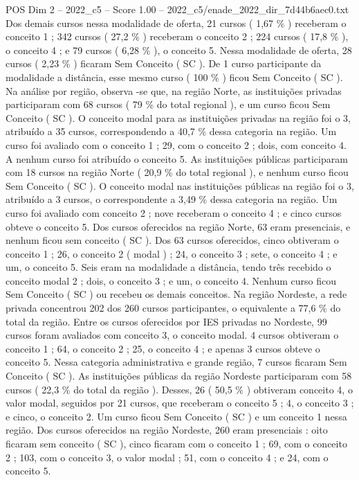\begin{textsample}{POS Dim 2 – 2022\_c5 – Score 1.00 – 2022\_c5/enade\_2022\_dir\_7d44b6aec0.txt}
Dos demais cursos nessa modalidade de oferta, 21 cursos ( 1,67 \% ) receberam o conceito 1 ; 342 cursos ( 27,2 \% ) receberam o conceito 2 ; 224 cursos ( 17,8 \% ), o conceito 4 ; e 79 cursos ( 6,28 \% ), o conceito 5.
Nessa modalidade de oferta, 28 cursos ( 2,23 \% ) ficaram Sem Conceito ( SC ).
De 1 curso participante da modalidade a distância, esse mesmo curso ( 100 \% ) ficou Sem Conceito ( SC ).
Na análise por região, observa -se que, na região Norte, as instituições privadas participaram com 68 cursos ( 79 \% do total regional ), e um curso ficou Sem Conceito ( SC ).
O conceito modal para as instituições privadas na região foi o 3, atribuído a 35 cursos, correspondendo a 40,7 \% dessa categoria na região.
Um curso foi avaliado com o conceito 1 ; 29, com o conceito 2 ; dois, com conceito 4.
A nenhum curso foi atribuído o conceito 5.
As instituições públicas participaram com 18 cursos na região Norte ( 20,9 \% do total regional ), e nenhum curso ficou Sem Conceito ( SC ).
O conceito modal nas instituições públicas na região foi o 3, atribuído a 3 cursos, o correspondente a 3,49 \% dessa categoria na região.
Um curso foi avaliado com conceito 2 ; nove receberam o conceito 4 ; e cinco cursos obteve o conceito 5.
Dos cursos oferecidos na região Norte, 63 eram presenciais, e nenhum ficou sem conceito ( SC ).
Dos 63 cursos oferecidos, cinco obtiveram o conceito 1 ; 26, o conceito 2 ( modal ) ; 24, o conceito 3 ; sete, o conceito 4 ; e um, o conceito 5.
Seis eram na modalidade a distância, tendo três recebido o conceito modal 2 ; dois, o conceito 3 ; e um, o conceito 4.
Nenhum curso ficou Sem Conceito ( SC ) ou recebeu os demais conceitos.
Na região Nordeste, a rede privada concentrou 202 dos 260 cursos participantes, o equivalente a 77,6 \% do total da região.
Entre os cursos oferecidos por IES privadas no Nordeste, 99 cursos foram avaliados com conceito 3, o conceito modal. 4 cursos obtiveram o conceito 1 ; 64, o conceito 2 ; 25, o conceito 4 ; e apenas 3 cursos obteve o conceito 5.
Nessa categoria administrativa e grande região, 7 cursos ficaram Sem Conceito ( SC ).
As instituições públicas da região Nordeste participaram com 58 cursos ( 22,3 \% do total da região ).
Desses, 26 ( 50,5 \% ) obtiveram conceito 4, o valor modal, seguidos por 21 cursos, que receberam o conceito 5 ; 4, o conceito 3 ; e cinco, o conceito 2.
Um curso ficou Sem Conceito ( SC ) e um conceito 1 nessa região.
Dos cursos oferecidos na região Nordeste, 260 eram presenciais : oito ficaram sem conceito ( SC ), cinco ficaram com o conceito 1 ; 69, com o conceito 2 ; 103, com o conceito 3, o valor modal ; 51, com o conceito 4 ; e 24, com o conceito 5.

\end{textsample}
